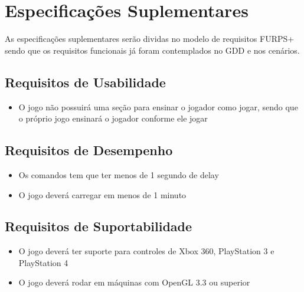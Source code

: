 \chapter[Especificações Suplementares]{Especificações Suplementares}

As especificações suplementares serão dividas no modelo de requisitos FURPS+ sendo que os requisitos funcionais já foram contemplados no GDD e nos cenários.

\section{Requisitos de Usabilidade}

\begin{itemize}
\item O jogo não possuirá uma seção para ensinar o jogador como jogar, sendo que o próprio jogo ensinará o jogador conforme ele jogar
\end{itemize}

\section{Requisitos de Desempenho}

\begin{itemize}
\item Os comandos tem que ter menos de 1 segundo de delay
\item O jogo deverá carregar em menos de 1 minuto
\end{itemize}

\section{Requisitos de Suportabilidade}

\begin{itemize}
\item O jogo deverá ter suporte para controles de Xbox 360, PlayStation 3 e PlayStation 4
\item O jogo deverá rodar em máquinas com OpenGL 3.3 ou superior
\end{itemize}
